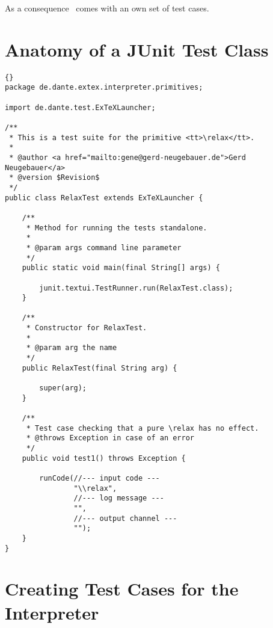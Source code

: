 As a consequence \ExTeX\ comes with an own set of test cases.

\section{Anatomy of a JUnit Test Class}

\INCOMPLETE

\begin{lstlisting}{}
package de.dante.extex.interpreter.primitives;

import de.dante.test.ExTeXLauncher;

/**
 * This is a test suite for the primitive <tt>\relax</tt>.
 *
 * @author <a href="mailto:gene@gerd-neugebauer.de">Gerd Neugebauer</a>
 * @version $Revision$
 */
public class RelaxTest extends ExTeXLauncher {

    /**
     * Method for running the tests standalone.
     *
     * @param args command line parameter
     */
    public static void main(final String[] args) {

        junit.textui.TestRunner.run(RelaxTest.class);
    }

    /**
     * Constructor for RelaxTest.
     *
     * @param arg the name
     */
    public RelaxTest(final String arg) {

        super(arg);
    }

    /**
     * Test case checking that a pure \relax has no effect.
     * @throws Exception in case of an error
     */
    public void test1() throws Exception {

        runCode(//--- input code ---
                "\\relax",
                //--- log message ---
                "",
                //--- output channel ---
                "");
    }
}
\end{lstlisting}


\section{Creating Test Cases for the Interpreter}

\INCOMPLETE

